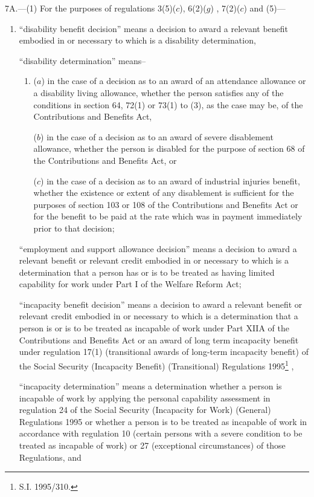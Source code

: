 \documentclass[12pt,a4paper]{article}
\begin{document}
7A.---(1)  For the purposes of regulations 3(5)($c$), 6(2)($g$)%
, 7(2)($c$) and (5)---  %
\begin{enumerate}\item[]
“disability benefit decision” means a decision to award a relevant benefit embodied in or necessary to which is a disability determination,

“disability determination” means–
\begin{enumerate}\item[]
($a$)
in the case of a decision as to an award of an attendance allowance or a disability living allowance, whether the person satisfies any of the conditions in section 64, 72(1) or 73(1) to (3), as the case may be, of the Contributions and Benefits Act,

($b$)
in the case of a decision as to an award of severe disablement allowance, whether the person is disabled for the purpose of section 68 of the Contributions and Benefits Act, or

($c$)
in the case of a decision as to an award of industrial injuries benefit, whether the existence or extent of any disablement is sufficient for the purposes of section 103 or 108 of the Contributions and Benefits Act or for the benefit to be paid at the rate which was in payment immediately prior to that decision;
\end{enumerate}

“employment and support allowance decision” means a decision to award a relevant benefit or relevant credit embodied in or necessary to which is a determination that a person has or is to be treated as having limited capability for work under Part I of the Welfare Reform Act;

“incapacity benefit decision” means a decision to award a relevant benefit 
or relevant credit  %
embodied in or necessary to which is a determination that a person is or is to be treated as incapable of work under Part XIIA of the Contributions and Benefits Act
or an award of long term incapacity benefit under regulation 17(1) (transitional awards of long-term incapacity benefit) of the Social Security (Incapacity Benefit) (Transitional) Regulations 1995\footnote{S.I. 1995/310.}%
,

\begin{sloppypar}
“incapacity determination” means a determination whether a person is incapable of work by applying the 
personal capability assessment  %
in regulation 24 of the Social Security (Incapacity for Work) (General) Regulations 1995 or whether a person is to be treated as incapable of work in accordance with regulation 10 (certain persons with a severe condition to be treated as incapable of work) or 27 (exceptional circumstances) of those Regulations, and
\end{sloppypar}


\end{enumerate}
\end{document}
